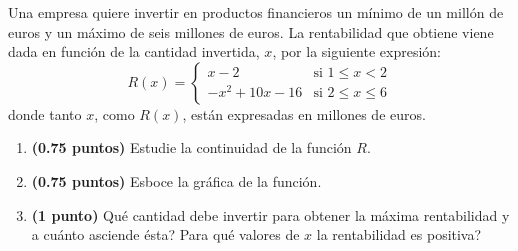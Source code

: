
Una empresa quiere invertir en productos financieros un mínimo de un millón de euros y un máximo de seis millones de euros. La rentabilidad que obtiene viene dada en función de la cantidad invertida, $x$, por la siguiente expresión:
\[
R(x)=\begin{cases}
x-2 & \text{si }1\leq x<2\\[4pt]
-x^2+10x-16 & \text{si }2\leq x\leq 6
\end{cases}
\]
donde tanto $x$, como $R(x)$, están expresadas en millones de euros.
\begin{enumerate}[label=\alph*)]
\item \textbf{(0.75 puntos)} Estudie la continuidad de la función $R$.
\item \textbf{(0.75 puntos)} Esboce la gráfica de la función.
\item \textbf{(1 punto)} \textquestiondown{}Qué cantidad debe invertir para obtener la máxima rentabilidad y a cuánto asciende ésta? \textquestiondown{}Para qué valores de $x$ la rentabilidad es positiva?
\end{enumerate}
